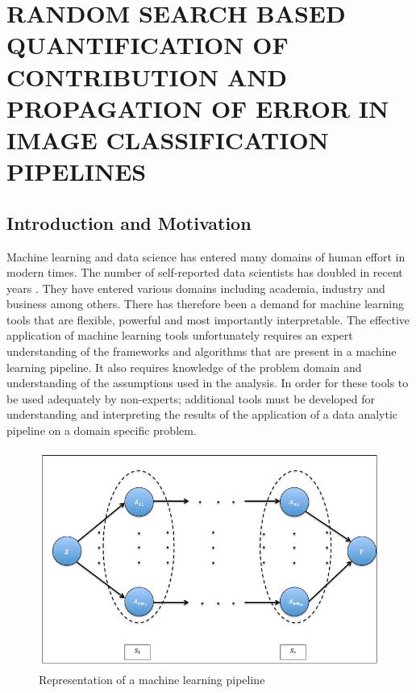 \chapter{RANDOM SEARCH BASED QUANTIFICATION OF CONTRIBUTION AND PROPAGATION OF ERROR IN IMAGE CLASSIFICATION PIPELINES}
\label{chap:EP}

\let\thefootnote\relax\footnotetext{}

\section{Introduction and Motivation}

Machine learning and data science has entered many domains of human effort in modern times. The number of self-reported data scientists has doubled in recent years \cite{harrison1995validity}. They have entered various domains including academia, industry and business among others. There has therefore been a demand for machine learning tools that are flexible, powerful and most importantly interpretable. The effective application of machine learning tools unfortunately requires an expert understanding of the frameworks and algorithms that are present in a machine learning pipeline. It also requires knowledge of the problem domain and understanding of the assumptions used in the analysis. In order for these tools to be used adequately by non-experts; additional tools must be developed for understanding and interpreting the results of the application of a data analytic pipeline on a domain specific problem.  

\begin{figure}[H]
    \centering
    \includegraphics[scale=0.5]{img/EP/generalized_pipeline}
    \caption{Representation of a machine learning pipeline}
    \label{fig:pipeline}
\end{figure}

